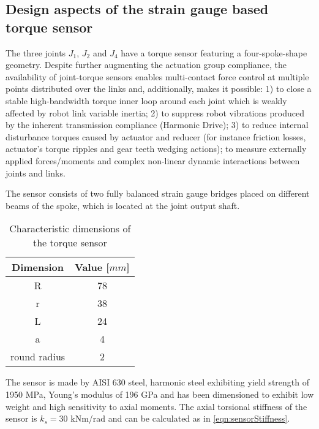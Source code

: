 \subsection{Design aspects of the strain gauge based torque sensor}
\label{subsec:DesignTorqueSensor}
The three joints $J_1$, $J_2$ and $J_4$ have a torque sensor featuring a four-spoke-shape geometry. 
Despite further augmenting the actuation group compliance, the availability of joint-torque sensors enables multi-contact force control at multiple points distributed over the links and, additionally, makes it possible: 1) to close a stable high-bandwidth torque inner loop around each joint which is weakly affected by robot link variable inertia; 2) to suppress robot vibrations produced by the inherent transmission compliance (Harmonic Drive); 3) to reduce internal disturbance torques caused by actuator and reducer (for instance friction losses, actuator's torque ripples and gear teeth wedging actions); to measure externally applied forces/moments and complex non-linear dynamic interactions between joints and links.
\par The sensor consists of two fully balanced strain gauge bridges placed on different beams of the spoke, which is located at the joint output shaft. 
%
%
\begin{table}[t]
	\renewcommand{\arraystretch}{1.3}
	\caption{Characteristic dimensions of the torque sensor}
	\label{tab:sensorDimension}
	\centering
	\begin{tabular}{c c}
		\hline \hline
		\bfseries Dimension & \bfseries Value [$mm$] \\
		\hline
		R & 78 \\
		r & 38 \\
		L & 24 \\
		a & 4 \\
		round radius & 2 \\
		\hline \hline
	\end{tabular}
\end{table} 
%
%
The sensor is made by AISI 630 steel, harmonic steel exhibiting yield strength of 1950 MPa, Young's modulus of 196 GPa and has been dimensioned to exhibit low weight and high sensitivity to axial moments.
The axial torsional stiffness of the sensor is $k_s = 30$  kNm/rad and can be calculated as in \eqref{eqn:sensorStiffness}.
